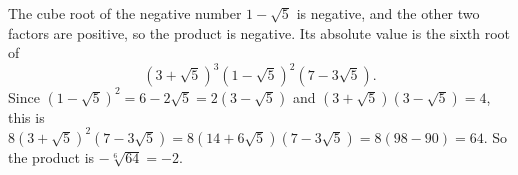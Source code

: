 The cube root of the negative number $1-\sqrt5$ is negative, and the other two factors are positive, so the product is negative. Its absolute value is the sixth root of
\[(3+\sqrt5)^3(1-\sqrt5)^2(7-3\sqrt5).\]
Since $(1-\sqrt5)^2=6-2\sqrt5=2(3-\sqrt5)$ and $(3+\sqrt5)(3-\sqrt5)=4$, this is $8(3+\sqrt5)^2(7-3\sqrt5)=8(14+6\sqrt5)(7-3\sqrt5)=8(98-90)=64$. So the product is $-\sqrt[6]{64}=\boxed{-2}$.
